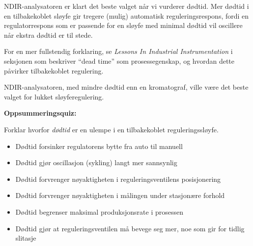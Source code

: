 





NDIR-analysatoren er klart det beste valget når vi vurderer dødtid. Mer dødtid i en tilbakekoblet sløyfe gir tregere (mulig) automatisk reguleringsrespons, fordi en regulatorrespons som er passende for en sløyfe med minimal dødtid vil oscillere når ekstra dødtid er til stede.

For en mer fullstendig forklaring, se {\it Lessons In Industrial Instrumentation} i seksjonen som beskriver ``dead time'' som prosessegenskap, og hvordan dette påvirker tilbakekoblet regulering.







NDIR-analysatoren, med mindre dødtid enn en kromatograf, ville være det beste valget for lukket sløyferegulering.

\vfil \eject

\noindent
{\bf Oppsummeringsquiz:}

Forklar hvorfor {\it dødtid} er en ulempe i en tilbakekoblet reguleringssløyfe.

\begin{itemize}
\item{} Dødtid forsinker regulatorens bytte fra auto til manuell
\vskip 5pt 
\item{} Dødtid gjør oscillasjon (sykling) langt mer sannsynlig
\vskip 5pt 
\item{} Dødtid forvrenger nøyaktigheten i reguleringsventilens posisjonering
\vskip 5pt 
\item{} Dødtid forvrenger nøyaktigheten i målingen under stasjonære forhold
\vskip 5pt 
\item{} Dødtid begrenser maksimal produksjonsrate i prosessen
\vskip 5pt 
\item{} Dødtid gjør at reguleringsventilen må bevege seg mer, noe som gir for tidlig slitasje
\end{itemize}




